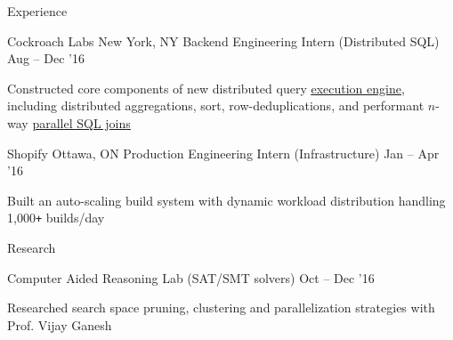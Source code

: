 \documentclass{resume} %
\begin{document}
\begin{rSection}{Experience}
  \begin{rWorkSection}{Cockroach Labs}
                     {New York, NY}
                     {Backend Engineering Intern (Distributed SQL)}
                     {Aug -- Dec '16}
    \item Constructed core components of new distributed query
      \href{https://github.com/cockroachdb/cockroach/blob/master/docs/RFCS/20160421_distributed_sql.md}
      {\underline{execution engine}}, including distributed aggregations, sort,
      row-deduplications, and performant $n$-way
      \href{https://www.cockroachlabs.com/blog/better-sql-joins-in-cockroachdb/}
      {\underline{parallel SQL joins}}
  \end{rWorkSection}

  \begin{rWorkSection}{Shopify}
                     {Ottawa, ON}
                     {Production Engineering Intern (Infrastructure)}
                     {Jan -- Apr '16}
  \item Built an auto-scaling build system with dynamic workload distribution
    handling 1,000\texttt{+} builds/day
  \end{rWorkSection}
  \vspace{0.5em}
\end{rSection}


\begin{rSection}{Research}
  \begin{rResearchSection}{Computer Aided Reasoning Lab}
                     {(SAT/SMT solvers)}
                     {Oct -- Dec '16}
   \item Researched search space pruning, clustering and
     parallelization strategies with Prof. Vijay Ganesh
  \end{rResearchSection}
  \vspace{0.5em}
\end{rSection}

\end{document}
